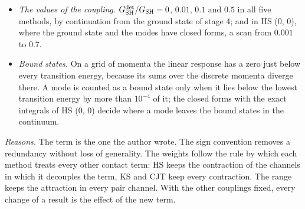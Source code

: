 \documentclass[
  10pt,
]{article}
\begin{document}
\begin{itemize}
\item
  \emph{The values of the coupling.}
  \(G^{\rm det}_{\rm SH}/G_{\rm SH}=0\), \(0.01\), \(0.1\) and \(0.5\)
  in all five methods, by continuation from the ground state of stage 4;
  and in HS (0, 0), where the ground state and the modes have closed
  forms, a scan from \(0.001\) to \(0.7\).
\item
  \emph{Bound states.} On a grid of momenta the linear response has a
  zero just below every transition energy, because its sums over the
  discrete momenta diverge there. A mode is counted as a bound state
  only when it lies below the lowest transition energy by more than
  \(10^{-4}\) of it; the closed forms with the exact integrals of HS (0,
  0) decide where a mode leaves the bound states in the continuum.
\end{itemize}

\emph{Reasons.} The term is the one the author wrote. The sign
convention removes a redundancy without loss of generality. The weights
follow the rule by which each method treats every other contact term: HS
keeps the contraction of the channels in which it decouples the term, KS
and CJT keep every contraction. The range keeps the attraction in every
pair channel. With the other couplings fixed, every change of a result
is the effect of the new term.
\end{document}

